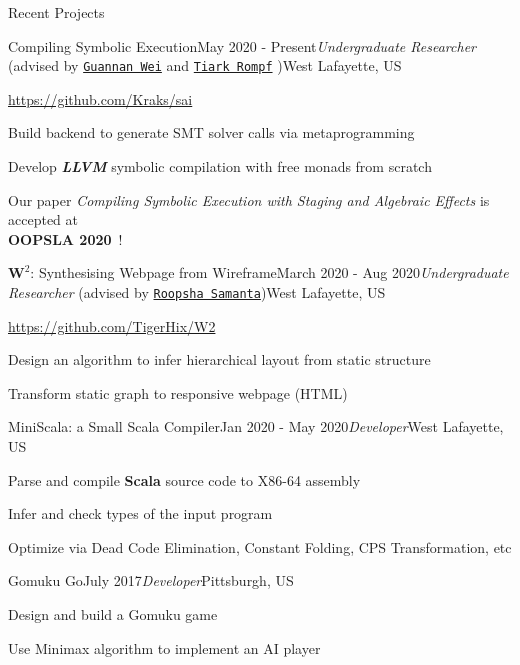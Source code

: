 \documentclass{resume} %
\begin{document}
\begin{rSection}{Recent Projects}

\begin{rSubsection}{Compiling Symbolic Execution}{May 2020 - Present}{\textit{Undergraduate Researcher} (advised by \href{http://continuation.passing.style/}{\texttt{Guannan Wei}} and \href{http://tiarkrompf.github.io/}{\texttt{Tiark Rompf}} )}{West Lafayette, US}
\item \url{https://github.com/Kraks/sai}
\item Build backend to generate SMT solver calls via metaprogramming
\item Develop \textbf{\it LLVM} symbolic compilation with free monads from scratch
\item Our paper \textit{Compiling Symbolic Execution with Staging and Algebraic Effects} is accepted at \\ \textbf{OOPSLA 2020}\ ! 
\end{rSubsection}


\begin{rSubsection}{$\mathbf{W}^2$: Synthesising Webpage from Wireframe}{March 2020 - Aug 2020}{\textit{Undergraduate Researcher} (advised by \href{https://www.cs.purdue.edu/homes/roopsha/}{\texttt{Roopsha Samanta}})}{West Lafayette, US}
\item \url{https://github.com/TigerHix/W2}
\item Design an algorithm to infer hierarchical layout from static structure
\item Transform static graph to responsive webpage (HTML)

\end{rSubsection}

\begin{rSubsection}{MiniScala: a Small Scala Compiler}{Jan 2020 - May 2020}{\textit{Developer}}{West Lafayette, US}
\item Parse and compile \textbf{Scala} source code to X86-64 assembly
\item Infer and check types of the input program
\item Optimize via Dead Code Elimination, Constant Folding, CPS Transformation, etc

\end{rSubsection}

\begin{rSubsection}{Gomuku Go}{July 2017}{\textit{Developer}}{Pittsburgh, US}
\item Design and build a Gomuku game 
\item Use Minimax algorithm to implement an AI player
\end{rSubsection}


\end{rSection}
\end{document}
